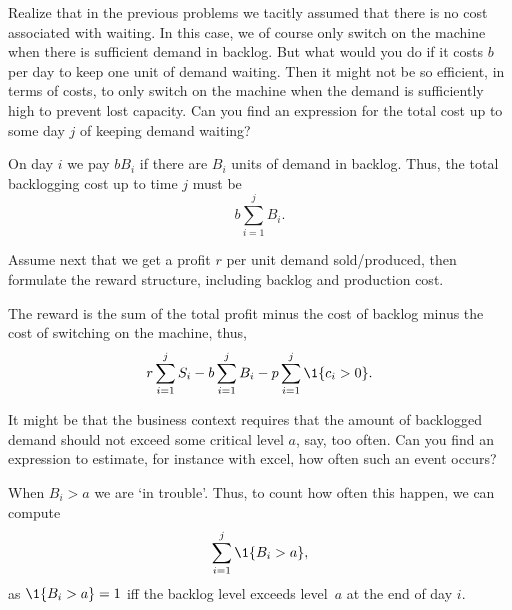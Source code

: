 \begin{exercise}
  Realize that in the previous problems we tacitly assumed that there
  is no cost associated with waiting.  In this case, we of course only
  switch on the machine when there is sufficient demand in
  backlog. But what would you do if it costs $b$ per day to keep one unit of demand
  waiting. Then it might not be so efficient, in terms of costs, to
  only switch on the machine when the demand is sufficiently high to
  prevent lost capacity. Can you find an expression for the total cost up to some day $j$ of
  keeping demand waiting?
  \begin{solution}
 On day $i$ we pay $b B_i$ if there are $B_i$ units of demand
    in backlog. Thus, the total backlogging cost up to time $j$ must be 
    \begin{equation*}
      b\sum_{i=1}^j B_i.
    \end{equation*}
  \end{solution}
\end{exercise}

\begin{exercise}
  Assume next that we get a profit $r$ per unit demand sold/produced, then
formulate the reward structure, including backlog and production cost.
  \begin{solution}
   The reward is the sum of the total profit minus the cost of backlog minus
    the cost of switching on the machine, thus,
    \begin{equation*}
     r \sum_{i=1}^j S_i - b \sum_{i=1}^j B_i - p \sum_{i=1}^j \1{c_i>0}.
    \end{equation*}
  \end{solution}
\end{exercise}


\begin{exercise}
  It might be that the business context requires that the amount of
  backlogged demand should not exceed some critical level $a$, say, too
  often. Can you find an expression to estimate, for instance with excel, how often such an
  event occurs? %


  \begin{solution}
    When $B_i>a$ we are `in trouble'. Thus, to count how often this happen, we can compute
    \begin{equation*}
      \sum_{i=1}^j \1{B_i > a},
    \end{equation*}
as $\1{B_i>a}=1$ iff the backlog level exceeds level~$a$ at the end of day $i$.
  \end{solution}
\end{exercise}


